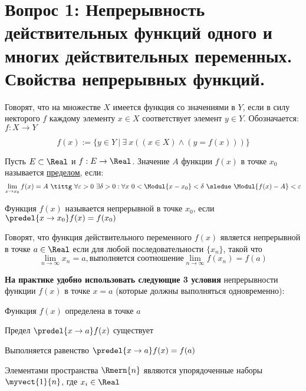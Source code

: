 \section{Вопрос 1: Непрерывность действительных функций одного и многих действительных переменных. Свойства непрерывных функций.}

\begin{defs}
Говорят, что на множестве $X$ имеется функция со значениями в $Y$, если в силу некторого $f$ каждому элементу $x \in X$ соответствует элемент $y \in Y$. Обозначается: $f: X \to Y$

$$f(x) := \{ y \in Y \ | \ \exists \ x ((x\in X) \wedge (y = f(x))) \} $$
\end{defs}


\begin{defs}
	Пусть $E \subset \Real$ и $f: E \to \Real$. Значение $A$ функции $f(x)$ в точке $x_0$ называется \underline{пределом}, если:
	$$\lim_{x\to x_0} f(x) = A \ \tittg \ \forall \varepsilon > 0 \ \exists \delta > 0: \forall x \ 0 < \Modul{x - x_0} < \delta \ \sledue \ \Modul{f(x) - A} < \varepsilon$$
\end{defs}

\begin{defs}
	Функция $f(x)$ называется непрерывной в точке $x_0$, если $\predel{x \to x_0}f(x) = f(x_0)$
\end{defs}

\begin{defs}
	Говорят, что функция действительного переменного $f(x)$ является непрерывной в точке $a \in \Real$ если для любой последовательности $\{x_n\}$, такой что
	$$\lim_{n \to \infty}x_n = a, \text{выполняется соотношение} \lim_{n \to \infty}f(x_n) = f(a)$$
\end{defs}

\textbf{На практике удобно использовать следующие 3 условия} непрерывности функции $f(x)$ в точке $x = a$ (которые должны выполняться одновременно):
\begin{enumerate*}
	\item Функция $f(x)$ определена в точке $a$
	\item Предел $\predel{x \to a}f(x)$ существует
	\item Выполняется равенство $\predel{x \to a}f(x)= f(a)$
\end{enumerate*}

\begin{defs}
	Элементами пространства $\Rmern{n}$ являются упорядоченные наборы $\myvect{1}{n}$, где $x_i \in \Real$
\end{defs}

